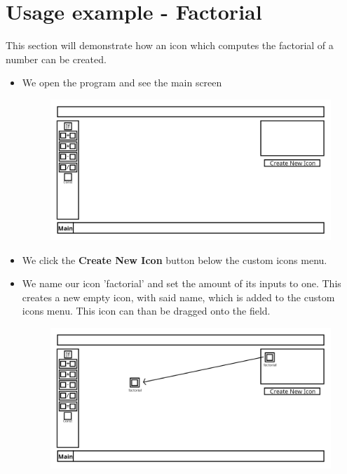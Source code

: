 \documentclass{article}
\begin{document}
    \section{Usage example - Factorial}
        This section will demonstrate how an icon which computes the factorial of a number can be created.
        \begin{itemize}
            \item
                We open the program and see the main screen
                \begin{figure}[H]
                    \includegraphics[width=\textwidth]{include/example_factorial_start.png}
                    \centering
                \end{figure}

            \item
                We click the \textbf{Create New Icon} button below the custom icons menu.

            \item
                We name our icon 'factorial' and set the amount of its inputs to one. This creates a new empty icon, with said name, which is added to the custom icons
                menu. This icon can than be dragged onto the field. 
                \begin{figure}[H]
                    \includegraphics[width=\textwidth]{include/example_factorial_add_icon.png}
                    \centering
                \end{figure}


\end{itemize}
\end{document}
